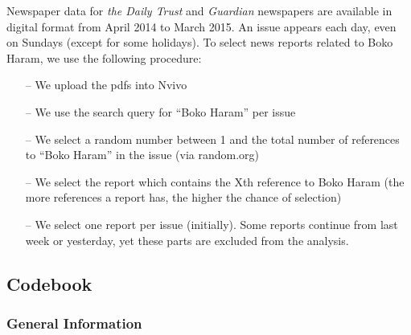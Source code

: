 Newspaper data for\textit{ the Daily Trust} and \textit{Guardian} newspapers are available in digital format from April 2014 to March 2015. An issue appears each day, even on Sundays (except for some holidays). To select news reports related to Boko Haram, we use the following procedure:
\begin{itemize}[noitemsep, nolistsep]
    \item[--] We upload the pdfs into Nvivo
    \item[--] We use the search query for “Boko Haram” per issue
    \item[--] We select a random number between 1 and the total number of references to “Boko Haram” in the issue (via random.org)
    \item[--] We select the report which contains the Xth reference to Boko Haram (the more references a report has, the higher the chance of selection)
    \item[--]We select one report per issue (initially). Some reports continue from last week or yesterday, yet these parts are excluded from the analysis. 
\end{itemize}


\subsection{Codebook}

\subsubsection{General Information}

